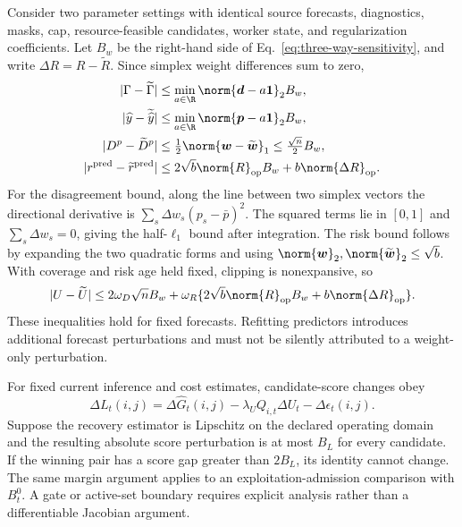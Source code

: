 Consider two parameter settings with identical source forecasts,
diagnostics, masks, cap, resource-feasible candidates, worker state, and
regularization coefficients. Let $B_w$ be the right-hand side of
Eq.~\eqref{eq:three-way-sensitivity}, and write
$\Delta R=R-\widetilde R$. Since simplex weight differences sum to zero,
\begin{align}
 |\Gamma-\widetilde\Gamma|
 &\le\min_{a\in\R}\norm{\boldsymbol d-a\boldsymbol1}_2 B_w,\\
 |\widehat y-\widetilde{\widehat y}|
 &\le\min_{a\in\R}\norm{\boldsymbol p-a\boldsymbol1}_2 B_w,\\
 |D^p-\widetilde D^p|&\le\tfrac12\norm{\boldsymbol w-
                      \widetilde{\boldsymbol w}}_1
                      \le\tfrac{\sqrt n}{2}B_w,\\
 |r^{\rm pred}-\widetilde r^{\rm pred}|
 &\le2\sqrt b\norm{R}_{\rm op}B_w+b\norm{\Delta R}_{\rm op}.
 \label{eq:representation-sensitivity}
\end{align}
For the disagreement bound, along the line between two simplex vectors the
directional derivative is
$\sum_s\Delta w_s(p_s-\bar p)^2$. The squared terms lie in $[0,1]$ and
$\sum_s\Delta w_s=0$, giving the half-$\ell_1$ bound after integration.
The risk bound follows by expanding the two quadratic forms and using
$\norm{\boldsymbol w}_2,\norm{\widetilde{\boldsymbol w}}_2\le\sqrt b$.
With coverage and risk age held fixed, clipping is nonexpansive, so
\begin{equation}
 |U-\widetilde U|\le
 2\omega_D\sqrt n B_w+
 \omega_R\{2\sqrt b\norm{R}_{\rm op}B_w+b\norm{\Delta R}_{\rm op}\}.
 \label{eq:uncertainty-sensitivity}
\end{equation}
These inequalities hold for fixed forecasts. Refitting predictors introduces
additional forecast perturbations and must not be silently attributed to a
weight-only perturbation.

For fixed current inference and cost estimates, candidate-score changes obey
\begin{equation}
 \Delta L_t(i,j)=\Delta\widehat G_t(i,j)
                -\lambda_UQ_{i,t}\Delta U_t-\Delta\epsilon_t(i,j).
 \label{eq:score-propagation}
\end{equation}
Suppose the recovery estimator is Lipschitz on the declared operating domain
and the resulting absolute score perturbation is at most $B_L$ for every
candidate. If the winning pair has a score gap greater than $2B_L$, its identity
cannot change. The same margin argument applies to an exploitation-admission
comparison with $B_t^0$. A gate or active-set boundary requires explicit
analysis rather than a differentiable Jacobian argument.

